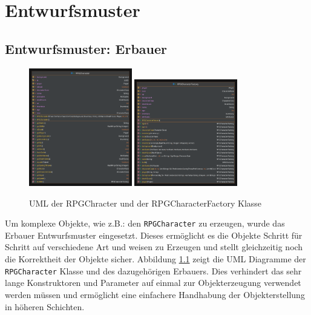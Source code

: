 \chapter{Entwurfsmuster}

\section{Entwurfsmuster:  Erbauer}
\begin{figure}[H]
	\centering
	\includegraphics[width=0.4\textwidth]{Bilder/RPGCharacter.pdf}
		\includegraphics[width=0.4\textwidth]{Bilder/RPGCharacterFactory.pdf}
	\caption{UML der RPGChracter und der RPGCharacterFactory Klasse}
	\label{fig:factory}
\end{figure}
Um komplexe Objekte, wie z.B.: den \texttt{RPGCharacter} zu erzeugen, wurde das Erbauer Entwurfsmuster eingesetzt. Dieses ermöglicht es die Objekte Schritt für Schritt auf verschiedene Art und weisen zu Erzeugen und stellt gleichzeitig noch die Korrektheit der Objekte sicher. Abbildung \ref{fig:factory} zeigt die UML Diagramme der \texttt{RPGCharacter} Klasse und des dazugehörigen Erbauers. Dies verhindert das sehr lange Konstruktoren und Parameter auf einmal zur Objekterzeugung verwendet werden müssen und ermöglicht eine einfachere Handhabung der Objekterstellung in höheren Schichten.

